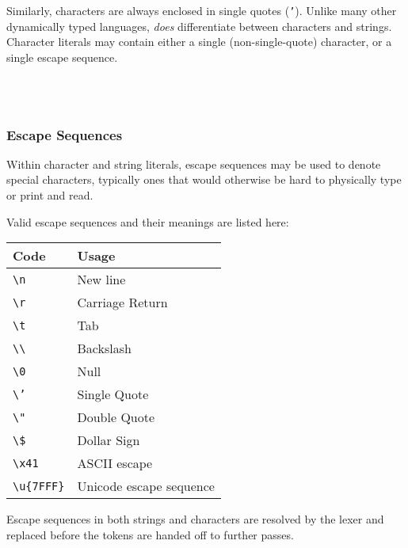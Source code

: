 Similarly, characters are always enclosed in single quotes (\texttt{'}).
Unlike many other dynamically typed languages, \Trilogy{} \emph{does} differentiate
between characters and strings. Character literals may contain either a
single (non-single-quote) character, or a single escape sequence.

\begin{bnf*}
     \\
     \\
\end{bnf*}

\subsubsection{Escape Sequences}

Within character and string literals, escape sequences may be used to denote
special characters, typically ones that would otherwise be hard to physically
type or print and read.

Valid escape sequences and their meanings are listed here:

\begin{table}[H]
    \centering
\begin{tabular}[c]{|ll|}
    \hline
    \textbf{Code} & \textbf{Usage} \\
    \hline
    \texttt{\textbackslash n} & New line \\
    \texttt{\textbackslash r} & Carriage Return \\
    \texttt{\textbackslash t} & Tab \\
    \texttt{\textbackslash\textbackslash} & Backslash \\
    \texttt{\textbackslash 0} & Null \\
    \texttt{\textbackslash '} & Single Quote \\
    \texttt{\textbackslash "} & Double Quote \\
    \texttt{\textbackslash \$} & Dollar Sign \\ %
    \texttt{\textbackslash x41} & ASCII escape \\
    \texttt{\textbackslash u\{7FFF\}} & Unicode escape sequence \\
    \hline
\end{tabular}
\end{table}

Escape sequences in both strings and characters are resolved by the lexer
and replaced before the tokens are handed off to further passes.

